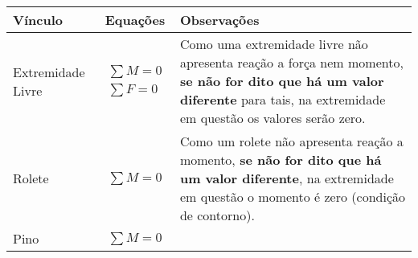 \documentclass{article}
\begin{document}
                \begin{table}[h]
                    \centering
                    \begin{tabular}{|l|c|l|}\hline
                        \textbf{Vínculo} & \textbf{Equações} & \textbf{Observações} \\ \hline
                        Extremidade Livre  & 
                            \begin{minipage}{.4\textwidth}
                                \begin{align*}
                                    \sum M = 0 \\ 
                                    \sum F = 0
                                \end{align*}
                            \end{minipage} &
                            
                            \begin{minipage}{.4\textwidth}
                                \vspace{5px}
                                Como uma extremidade livre não apresenta reação a força nem momento, \textbf{se não for dito que há um valor diferente} para tais, na extremidade em questão os valores serão zero.
                            \end{minipage} \\ \hline

                        Rolete & 
                            \begin{minipage}{.4\textwidth}
                                \begin{align*}
                                    \sum M = 0
                                \end{align*}
                            \end{minipage} &
                            
                            \begin{minipage}{.4\textwidth}
                                \vspace{5px}
                                Como um rolete não apresenta reação a momento, \textbf{se não for dito que há um valor diferente}, na extremidade em questão  o momento é zero (condição de contorno).
                            \end{minipage} \\ \hline                       

                        Pino & 
                            \begin{minipage}{.4\textwidth}
                                \begin{align*}
                                    \sum M = 0
                                \end{align*}
                            \end{minipage} &
                            

\end{tabular}
\end{table}
\end{document}
